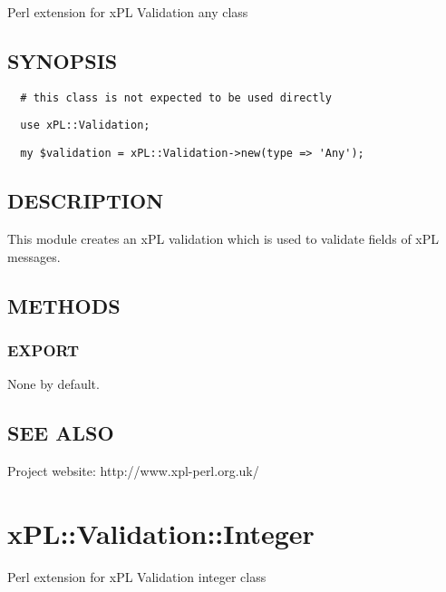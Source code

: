 \documentclass[12pt,a4paper]{article}
\begin{document}
Perl extension for xPL Validation any class

\subsection*{SYNOPSIS\label{xPL::Validation::Any_SYNOPSIS}}
\begin{verbatim}
  # this class is not expected to be used directly
\end{verbatim}
\begin{verbatim}
  use xPL::Validation;
\end{verbatim}
\begin{verbatim}
  my $validation = xPL::Validation->new(type => 'Any');
\end{verbatim}
\subsection*{DESCRIPTION\label{xPL::Validation::Any_DESCRIPTION}}


This module creates an xPL validation which is used to validate fields
of xPL messages.

\subsection*{METHODS\label{xPL::Validation::Any_METHODS}}
\subsubsection*{EXPORT\label{xPL::Validation::Any_EXPORT}}


None by default.

\subsection*{SEE ALSO\label{xPL::Validation::Any_SEE_ALSO}}


Project website: http://www.xpl-perl.org.uk/

\newpage
\section{xPL::Validation::Integer\label{xPL::Validation::Integer}}


Perl extension for xPL Validation integer class
\end{document}
